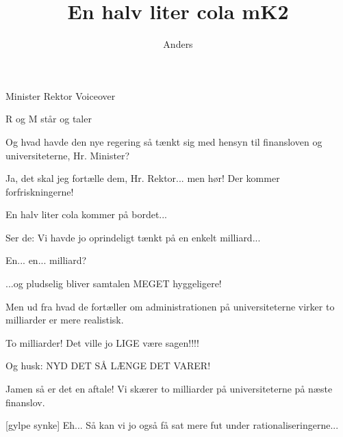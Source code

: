 \documentclass[a4paper,11pt]{article}
\title{En halv liter cola mK2}
\author{Anders}
\begin{document}
\maketitle

\begin{roles}
 Minister
 Rektor
 Voiceover
\end{roles}

\begin{props}
\end{props}

\begin{sketch}

\scene R og M står og taler

 Og hvad havde den nye regering så tænkt sig med hensyn til
finansloven og universiteterne, Hr. Minister?

 Ja, det skal jeg fortælle dem, Hr. Rektor... men hør! Der
kommer forfriskningerne!

 En halv liter cola kommer på bordet...

 Ser de: Vi havde jo oprindeligt tænkt på en enkelt
milliard...

 En... en... milliard?

 ...og pludselig bliver samtalen MEGET hyggeligere!

 Men ud fra hvad de fortæller om administrationen på
universiteterne virker to milliarder er mere realistisk.

 To milliarder! Det ville jo LIGE være sagen!!!!

 Og husk: NYD DET SÅ LÆNGE DET VARER!

 Jamen så er det en aftale! Vi skærer to milliarder på
universiteterne på næste finanslov.

[gylpe synke] Eh... Så kan vi jo også få sat mere fut under
rationaliseringerne...

\end{sketch}
\end{document}
